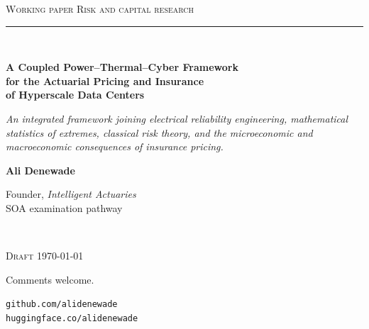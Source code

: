 \documentclass[11pt,a4paper]{article}
\theoremstyle{ia}
\newcommand{\1}{\mathbf{1}}
\begin{document}
\begin{titlepage}
\thispagestyle{empty}
\vspace*{2.6cm}

\noindent
{\sffamily\footnotesize\color{iaaccent}\textsc{Working paper \textbar{} Risk and capital research}}\\[0.45cm]

{\color{iaaccent}\rule{2.2cm}{1.2pt}}\\[0.85cm]

\noindent
{\sffamily\bfseries\LARGE\color{iadark}%
A Coupled Power--Thermal--Cyber Framework\\[6pt]
for the Actuarial Pricing and Insurance\\[6pt]
of Hyperscale Data Centers \par}

\vspace{1.0cm}

\noindent
{\rmfamily\itshape\large\color{iagrey}%
An integrated framework joining electrical reliability engineering,
mathematical statistics of extremes, classical risk theory, and the
microeconomic and macroeconomic consequences of insurance pricing.\par}

\vspace{1.8cm}

\noindent
{\sffamily\large\color{iadark}\textbf{Ali Denewade}\par}
\vspace{0.25cm}
\noindent
{\sffamily\footnotesize\color{iagrey}%
Founder, \emph{Intelligent Actuaries}\\
SOA examination pathway\par}

\vfill

\noindent{\color{iarule}\rule{\textwidth}{0.4pt}}\\[8pt]
\noindent
\begin{minipage}[t]{0.55\textwidth}
  {\sffamily\footnotesize\color{iagrey}%
  \textsc{Draft} \textbar{} \today\par
  \vspace{2pt}
  Comments welcome.\par}
\end{minipage}\hfill
\begin{minipage}[t]{0.40\textwidth}\raggedleft
  {\sffamily\footnotesize\color{iagrey}%
  \texttt{github.com/alidenewade}\\
  \texttt{huggingface.co/alidenewade}\par}
\end{minipage}

\end{titlepage}
\end{document}
